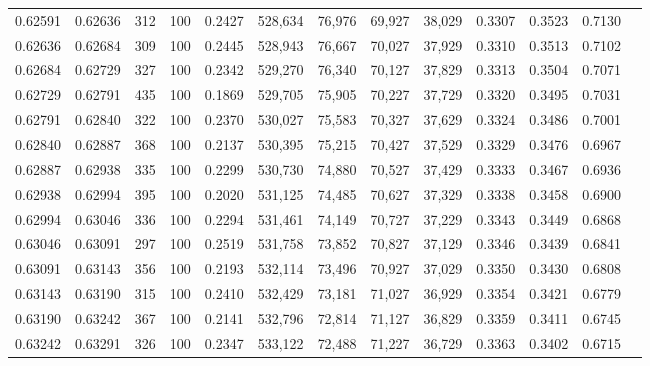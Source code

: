 \begin{tabular}{rrrrrrrrrrrrr}
0.62591 & 0.62636 &   312 & 100 &                                     0.2427 & 528,634 &  76,976 &  69,927 &  38,029 & 0.3307 & 0.3523 & 0.7130 \\
0.62636 & 0.62684 &   309 & 100 &                                     0.2445 & 528,943 &  76,667 &  70,027 &  37,929 & 0.3310 & 0.3513 & 0.7102 \\
0.62684 & 0.62729 &   327 & 100 &                                     0.2342 & 529,270 &  76,340 &  70,127 &  37,829 & 0.3313 & 0.3504 & 0.7071 \\
0.62729 & 0.62791 &   435 & 100 &                                     0.1869 & 529,705 &  75,905 &  70,227 &  37,729 & 0.3320 & 0.3495 & 0.7031 \\
0.62791 & 0.62840 &   322 & 100 &                                     0.2370 & 530,027 &  75,583 &  70,327 &  37,629 & 0.3324 & 0.3486 & 0.7001 \\
0.62840 & 0.62887 &   368 & 100 &                                     0.2137 & 530,395 &  75,215 &  70,427 &  37,529 & 0.3329 & 0.3476 & 0.6967 \\
0.62887 & 0.62938 &   335 & 100 &                                     0.2299 & 530,730 &  74,880 &  70,527 &  37,429 & 0.3333 & 0.3467 & 0.6936 \\
0.62938 & 0.62994 &   395 & 100 &                                     0.2020 & 531,125 &  74,485 &  70,627 &  37,329 & 0.3338 & 0.3458 & 0.6900 \\
0.62994 & 0.63046 &   336 & 100 &                                     0.2294 & 531,461 &  74,149 &  70,727 &  37,229 & 0.3343 & 0.3449 & 0.6868 \\
0.63046 & 0.63091 &   297 & 100 &                                     0.2519 & 531,758 &  73,852 &  70,827 &  37,129 & 0.3346 & 0.3439 & 0.6841 \\
0.63091 & 0.63143 &   356 & 100 &                                     0.2193 & 532,114 &  73,496 &  70,927 &  37,029 & 0.3350 & 0.3430 & 0.6808 \\
0.63143 & 0.63190 &   315 & 100 &                                     0.2410 & 532,429 &  73,181 &  71,027 &  36,929 & 0.3354 & 0.3421 & 0.6779 \\
0.63190 & 0.63242 &   367 & 100 &                                     0.2141 & 532,796 &  72,814 &  71,127 &  36,829 & 0.3359 & 0.3411 & 0.6745 \\
0.63242 & 0.63291 &   326 & 100 &                                     0.2347 & 533,122 &  72,488 &  71,227 &  36,729 & 0.3363 & 0.3402 & 0.6715 \\

\end{tabular}
